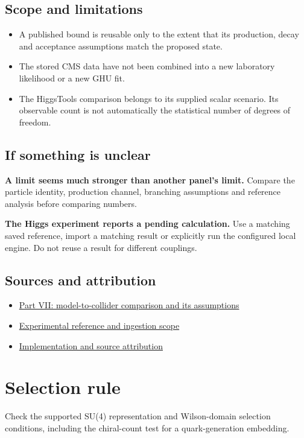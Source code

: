 \documentclass[11pt,a4paper]{article}
\begin{document}
\subsection*{Scope and limitations}
\begin{itemize}
\item A published bound is reusable only to the extent that its production, decay and acceptance assumptions match the proposed state.
\item The stored CMS data have not been combined into a new laboratory likelihood or a new GHU fit.
\item The HiggsTools comparison belongs to its supplied scalar scenario. Its observable count is not automatically the statistical number of degrees of freedom.
\end{itemize}
\subsection*{If something is unclear}
\textbf{A limit seems much stronger than another panel's limit.} Compare the particle identity, production channel, branching assumptions and reference analysis before comparing numbers.

\textbf{The Higgs experiment reports a pending calculation.} Use a matching saved reference, import a matching result or explicitly run the configured local engine. Do not reuse a result for different couplings.

\subsection*{Sources and attribution}
\begin{itemize}
\item \href{https://karlesmarin.github.io/ghu-explorer/papers/part-vii/index.html}{Part VII: model-to-collider comparison and its assumptions}
\item \href{https://karlesmarin.github.io/ghu-explorer/docs/su7-certification.html}{Experimental reference and ingestion scope}
\item \href{https://github.com/karlesmarin/ghu-lab/blob/main/src/sections/collider_section.js}{Implementation and source attribution}
\end{itemize}
\section{Selection rule}
Check the supported SU(4) representation and Wilson-domain selection conditions, including the chiral-count test for a quark-generation embedding.
\end{document}
